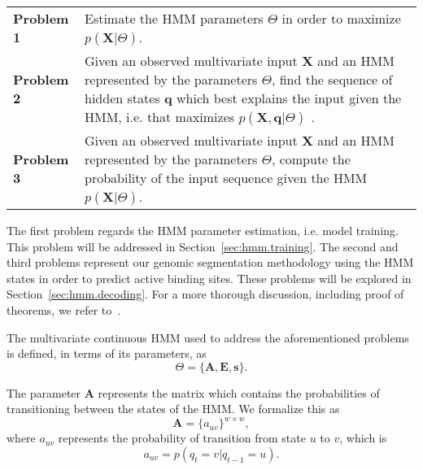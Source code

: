 \begin{center}
  \begin{tabular}{lp{.8\linewidth}}
    {\bf Problem 1} & Estimate the HMM parameters $ \Theta $ in order to maximize $p(\mathbf{X} | \Theta)$. \\[0.2cm]
    {\bf Problem 2} & Given an observed multivariate input $ \mathbf{X} $ and an HMM represented by the parameters $ \Theta $, find the sequence of hidden states $ \mathbf{q} $ which best explains the input given the HMM, i.e. that maximizes $ p\left( \mathbf{X}, \mathbf{q} | \Theta \right) $ . \\[0.2cm]
    {\bf Problem 3} & Given an observed multivariate input $ \mathbf{X} $ and an HMM represented by the parameters $ \Theta $, compute the probability of the input sequence given the HMM $p(\mathbf{X} | \Theta)$. \\[0.2cm]
  \end{tabular}
\end{center}

The first problem regards the HMM parameter estimation, i.e. model training. This problem will be addressed in Section~\ref{sec:hmm.training}. The second and third problems represent our genomic segmentation methodology using the HMM states in order to predict active binding sites. These problems will be explored in Section~\ref{sec:hmm.decoding}. For a more thorough discussion, including proof of theorems, we refer to~\cite{rabiner1989,durbin1998,mitchell1997,bishop2006,duda2000}.

The multivariate continuous HMM used to address the aforementioned problems is defined, in terms of its parameters, as
\begin{equation}
  \label{eq:hmm.theta}
  \Theta= \{\mathbf{A}, \mathbf{E}, \mathbf{s}\}.
\end{equation}

The parameter $\mathbf{A}$ represents the matrix which contains the probabilities of transitioning between the states of the HMM. We formalize this as
\begin{equation}
  \label{eq:hmm.a}
  \mathbf{A} = {\{a_{uv}\}}^{w \times w},
\end{equation}
where $a_{uv}$ represents the probability of transition from state $u$ to $v$, which is
\begin{equation}
  \label{eq:hmm.transition}
  a_{uv} = p(q_t = v | q_{t-1} = u).
\end{equation}


